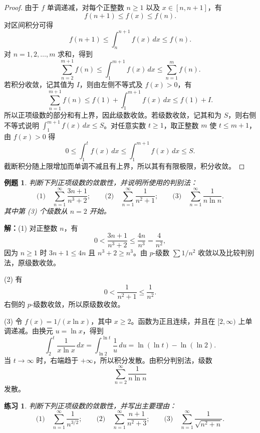 \documentclass[UTF8,fontset=fandol,11pt]{ctexart}
\newtheorem{example}[definition]{例题}
\newtheorem{exercise}[definition]{练习}
\begin{document}
\begin{proof}
由于 $f$ 单调递减，对每个正整数 $n\geq1$ 以及 $x\in[n,n+1]$，有
\[
f(n+1)\leq f(x)\leq f(n).
\]
对区间积分可得
\[
f(n+1)\leq\int_n^{n+1}f(x)\,dx\leq f(n).
\]
对 $n=1,2,\ldots,m$ 求和，得到
\[
\sum_{n=2}^{m+1}f(n)\leq\int_1^{m+1}f(x)\,dx\leq\sum_{n=1}^{m}f(n).
\]
若积分收敛，记其值为 $I$，则由左侧不等式及 $f(x)>0$，有
\[
\sum_{n=1}^{m+1}f(n)\leq f(1)+\int_1^{m+1}f(x)\,dx\leq f(1)+I.
\]
所以正项级数的部分和有上界，因此级数收敛。若级数收敛，记其和为 $S$，则右侧不等式说明 $\int_1^{m+1}f(x)\,dx\leq S$。对任意实数 $t\geq1$，取正整数 $m$ 使 $t\leq m+1$，由 $f(x)>0$ 得
\[
0\leq\int_1^t f(x)\,dx\leq\int_1^{m+1}f(x)\,dx\leq S.
\]
截断积分随上限增加而单调不减且有上界，所以其有有限极限，积分收敛。
\end{proof}
\begin{example}
判断下列正项级数的敛散性，并说明所使用的判别法：
\[
\text{(1)}\quad\sum_{n=1}^{\infty}\frac{3n+1}{n^3+2};
\qquad
\text{(2)}\quad\sum_{n=1}^{\infty}\frac{1}{n^2+1};
\qquad
\text{(3)}\quad\sum_{n=1}^{\infty}\frac{1}{n\ln n}.
\]
其中第 (3) 个级数从 $n=2$ 开始。
\end{example}
\par\noindent\textbf{解：}(1) 对正整数 $n$，有
\[
0<\frac{3n+1}{n^3+2}\leq\frac{4n}{n^3}=\frac{4}{n^2},
\]
因为 $n\geq1$ 时 $3n+1\leq4n$ 且 $n^3+2\geq n^3$。由 $p$-级数 $\sum 1/n^2$ 收敛以及比较判别法，原级数收敛。

(2) 有
\[
0<\frac{1}{n^2+1}\leq\frac{1}{n^2}.
\]
右侧的 $p$-级数收敛，所以原级数收敛。

(3) 令 $f(x)=1/(x\ln x)$，其中 $x\geq2$。函数为正且连续，并且在 $[2,\infty)$ 上单调递减。由换元 $u=\ln x$，得到
\[
\int_2^t\frac{1}{x\ln x}\,dx
=\int_{\ln2}^{\ln t}\frac{1}{u}\,du
=\ln(\ln t)-\ln(\ln2).
\]
当 $t\to\infty$ 时，右端趋于 $+\infty$，所以积分发散。由积分判别法，级数
\[
\sum_{n=2}^{\infty}\frac{1}{n\ln n}
\]
发散。\par
\begin{exercise}
\label{mathagent:exercise:0f13776c11d825df9fdf2c3c249691355909a96d5e874285ceb15e0c4116d477}
判断下列正项级数的敛散性，并写出主要理由：
\[
\text{(1)}\quad\sum_{n=1}^{\infty}\frac{1}{n^{3/2}};
\qquad
\text{(2)}\quad\sum_{n=1}^{\infty}\frac{n+1}{n^2+3};
\qquad
\text{(3)}\quad\sum_{n=1}^{\infty}\frac{1}{\sqrt{n^2+n}}.
\]

\end{exercise}
\end{document}
